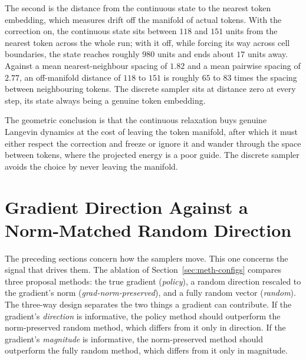 The second is the distance from the continuous state to the nearest token embedding, which measures drift off the manifold of actual tokens. With the correction on, the continuous state sits between $118$ and $151$ units from the nearest token across the whole run; with it off, while forcing its way across cell boundaries, the state reaches roughly $980$ units and ends about $17$ units away.
Against a mean nearest-neighbour spacing of $1.82$ and a mean pairwise spacing of $2.77$, an off-manifold distance of $118$ to $151$ is roughly $65$ to $83$ times the spacing between neighbouring tokens. The discrete sampler sits at distance zero at every step, its state always being a genuine token embedding.

The geometric conclusion is that the continuous relaxation buys genuine Langevin dynamics at the cost of leaving the token manifold, after which it must either respect the correction and freeze or ignore it and wander through the space between tokens, where the projected energy is a poor guide. The discrete sampler avoids the choice by never leaving the manifold.

\section{Gradient Direction Against a Norm-Matched Random Direction}
\label{sec:results-fallacy}

The preceding sections concern how the samplers move. This one concerns the signal that drives them. The ablation of Section~\ref{sec:meth-configs} compares three proposal methods: the true gradient (\emph{policy}), a random direction rescaled to the gradient's norm (\emph{grad-norm-preserved}), and a fully random vector (\emph{random}). The three-way design separates the two things a gradient can contribute. If the gradient's \emph{direction} is informative, the policy method should outperform the norm-preserved random method, which differs from it only in direction. If the gradient's \emph{magnitude} is informative, the norm-preserved method should outperform the fully random method, which differs from it only in magnitude.

